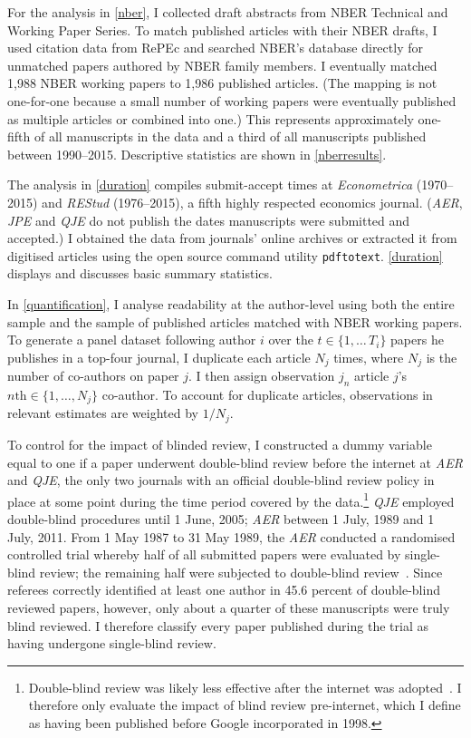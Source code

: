 For the analysis in \autoref{nber}, I collected draft abstracts from NBER Technical and Working Paper Series. To match published articles with their NBER drafts, I used citation data from RePEc and searched NBER's database directly for unmatched papers authored by NBER family members. I eventually matched 1,988 NBER working papers to 1,986 published articles. (The mapping is not one-for-one because a small number of working papers were eventually published as multiple articles or combined into one.) This represents approximately one-fifth of all manuscripts in the data and a third of all manuscripts published between 1990--2015. Descriptive statistics are shown in \autoref{nberresults}.

The analysis in \autoref{duration} compiles submit-accept times at \emph{Econometrica} (1970--2015) and \emph{REStud} (1976--2015), a fifth highly respected economics journal. (\emph{AER}, \emph{JPE} and \emph{QJE} do not publish the dates manuscripts were submitted and accepted.) I obtained the data from journals' online archives or extracted it from digitised articles using the open source command utility \texttt{pdftotext}. \autoref{duration} displays and discusses basic summary statistics.

In \autoref{quantification}, I analyse readability at the author-level using both the entire sample and the sample of published articles matched with NBER working papers. To generate a panel dataset following author $i$ over the $t\in\{1,\ldots\,T_i\}$ papers he publishes in a top-four journal, I duplicate each article $N_j$ times, where $N_j$ is the number of co-authors on paper $j$. I then assign observation $j_n$ article $j$'s $n\text{th}\in\{1,\ldots,N_j\}$ co-author. To account for duplicate articles, observations in relevant estimates are weighted by $1/N_j$.

To control for the impact of blinded review, I constructed a dummy variable equal to one if a paper underwent double-blind review before the internet at \emph{AER} and \emph{QJE}, the only two journals with an official double-blind review policy in place at some point during the time period covered by the data.\footnote{Double-blind review was likely less effective after the internet was adopted~\citep[for anecdotal evidence, see, \emph{e.g.},][]{Goldberg2014}. I therefore only evaluate the impact of blind review pre-internet, which I define as having been published before Google incorporated in 1998.} \emph{QJE} employed double-blind procedures until 1 June, 2005; \emph{AER} between 1 July, 1989 and 1 July, 2011. From 1 May 1987 to 31 May 1989, the \emph{AER} conducted a randomised controlled trial whereby half of all submitted papers were evaluated by single-blind review; the remaining half were subjected to double-blind review~\citep{Blank1991}. Since referees correctly identified at least one author in 45.6 percent of double-blind reviewed papers, however, only about a quarter of these manuscripts were truly blind reviewed. I therefore classify every paper published during the trial as having undergone single-blind review.

